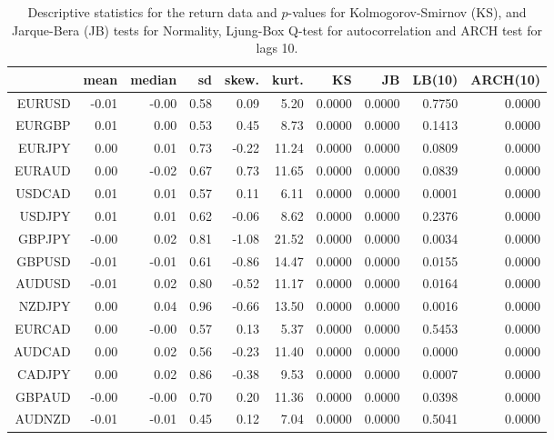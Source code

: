\begin{table}[ht]
\centering
\begin{tabular}{rrrrrrrrrr}
  \hline
 & mean & median & sd & skew. & kurt. & KS & JB & LB(10) & ARCH(10) \\ 
  \hline
EURUSD & -0.01 & -0.00 & 0.58 & 0.09 & 5.20 & 0.0000 & 0.0000 & 0.7750 & 0.0000 \\ 
  EURGBP & 0.01 & 0.00 & 0.53 & 0.45 & 8.73 & 0.0000 & 0.0000 & 0.1413 & 0.0000 \\ 
  EURJPY & 0.00 & 0.01 & 0.73 & -0.22 & 11.24 & 0.0000 & 0.0000 & 0.0809 & 0.0000 \\ 
  EURAUD & 0.00 & -0.02 & 0.67 & 0.73 & 11.65 & 0.0000 & 0.0000 & 0.0839 & 0.0000 \\ 
  USDCAD & 0.01 & 0.01 & 0.57 & 0.11 & 6.11 & 0.0000 & 0.0000 & 0.0001 & 0.0000 \\ 
  USDJPY & 0.01 & 0.01 & 0.62 & -0.06 & 8.62 & 0.0000 & 0.0000 & 0.2376 & 0.0000 \\ 
  GBPJPY & -0.00 & 0.02 & 0.81 & -1.08 & 21.52 & 0.0000 & 0.0000 & 0.0034 & 0.0000 \\ 
  GBPUSD & -0.01 & -0.01 & 0.61 & -0.86 & 14.47 & 0.0000 & 0.0000 & 0.0155 & 0.0000 \\ 
  AUDUSD & -0.01 & 0.02 & 0.80 & -0.52 & 11.17 & 0.0000 & 0.0000 & 0.0164 & 0.0000 \\ 
  NZDJPY & 0.00 & 0.04 & 0.96 & -0.66 & 13.50 & 0.0000 & 0.0000 & 0.0016 & 0.0000 \\ 
  EURCAD & 0.00 & -0.00 & 0.57 & 0.13 & 5.37 & 0.0000 & 0.0000 & 0.5453 & 0.0000 \\ 
  AUDCAD & 0.00 & 0.02 & 0.56 & -0.23 & 11.40 & 0.0000 & 0.0000 & 0.0000 & 0.0000 \\ 
  CADJPY & 0.00 & 0.02 & 0.86 & -0.38 & 9.53 & 0.0000 & 0.0000 & 0.0007 & 0.0000 \\ 
  GBPAUD & -0.00 & -0.00 & 0.70 & 0.20 & 11.36 & 0.0000 & 0.0000 & 0.0398 & 0.0000 \\ 
  AUDNZD & -0.01 & -0.01 & 0.45 & 0.12 & 7.04 & 0.0000 & 0.0000 & 0.5041 & 0.0000 \\ 
   \hline
\end{tabular}
\caption{Descriptive statistics for the return data and
              $p$-values for Kolmogorov-Smirnov (KS), 
             and Jarque-Bera (JB) tests for Normality, 
             Ljung-Box Q-test for autocorrelation and ARCH test for lags 10.} 
\label{table:rets_desc_FX}
\end{table}
